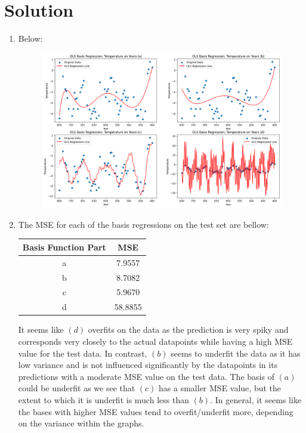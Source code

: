 \documentclass[submit]{../harvardml}
\newenvironment{solution}
  {\color{blue}\section*{Solution}}
{}
\begin{document}
\newpage 
\begin{solution}
	\begin{enumerate}
	    \item Below:
        \begin{figure}[H]
	    \centering
	    \includegraphics[width=0.8\linewidth]{p3.1.png}
	\end{figure}

        \item The MSE for each of the basis regressions on the test set are bellow:
            \begin{table}[h]
                \centering
                {\color{blue}
                \begin{tabular}{|c|c|}
                    \hline
                    \textbf{Basis Function Part} & \textbf{MSE} \\
                    \hline
                    a & 7.9557 \\
                    b & 8.7082 \\
                    c & 5.9670 \\
                    d & 58.8855 \\
                    \hline
                \end{tabular}}
                \label{tab:mse_values}
            \end{table}

            It seems like $(d)$ overfits on the data as the prediction is very spiky and corresponds very closely to the actual datapoints while having a high MSE value for the test data. In contrast, $(b)$ seems to underfit the data as it has low variance and is not influenced significantly by the datapoints in its predictions with a moderate MSE value on the test data. The basis of $(a)$ could be underfit as we see that $(c)$ has a smaller MSE value, but the extent to which it is underfit is much less than $(b)$. In general, it seems like the bases with higher MSE values tend to overfit/underfit more, depending on the variance within the graphs.
            

\end{enumerate}
\end{solution}
\end{document}
